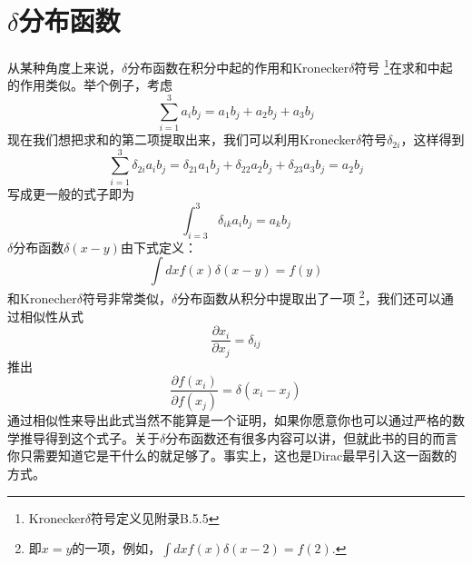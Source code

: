 \section{$\delta$分布函数}\label{appendix.D.2}
从某种角度上来说，$\delta$分布函数在积分中起的作用和Kronecker$\delta$符号
\footnote{Kronecker$\delta$符号定义见附录B.5.5}在求和中起的作用类似。举个例子，考虑
\begin{equation}
  \sum_{i=1}^3 a_i b_j=a_1 b_j+a_2 b_j+a_3 b_j
\end{equation}
现在我们想把求和的第二项提取出来，我们可以利用Kronecker$\delta$符号$\delta_{2i}$，这样得到
\begin{equation}
  \sum_{i=1}^3 \delta_{2i} a_i b_j=\delta_{21} a_1 b_j+\delta_{22} a_2 b_j+\delta_{23} a_3 b_j=a_2 b_j
\end{equation}
写成更一般的式子即为
\begin{equation}
  \int^3_{i=3} \delta_{ik} a_i b_j=a_k b_j
\end{equation}
$\delta$分布函数$\delta(x-y)$由下式定义：
\begin{equation}
    \int dx f(x)\delta(x-y)=f(y)
\end{equation}
和Kronecher$\delta$符号非常类似，$\delta$分布函数从积分中提取出了一项
\footnote{即$x=y$的一项，例如，$\int dx f(x)\delta(x-2)=f(2)$.}，我们还可以通过相似性从式
\begin{equation}
  \frac{\partial x_i}{\partial x_j}=\delta_{ij}
\end{equation}
推出
\begin{equation}
    \frac{\partial f(x_i)}{\partial f(x_j)}=\delta(x_i-x_j)
\end{equation}
通过相似性来导出此式当然不能算是一个证明，如果你愿意你也可以通过严格的数学推导得到这个式子。关于$\delta$分布函数还有很多内容可以讲，但就此书的目的而言你只需要知道它是干什么的就足够了。事实上，这也是Dirac最早引入这一函数的方式。
